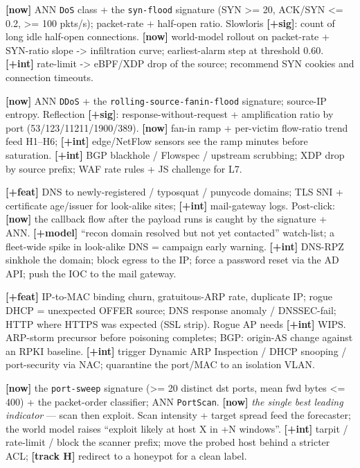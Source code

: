 \documentclass[11pt,a4paper]{article}
\begin{document}
{\textbf{[now]} ANN \texttt{DoS} class + the \texttt{syn-flood} signature (SYN >= 20, ACK/SYN <= 0.2, >= 100 pkts/s); packet-rate + half-open ratio. Slowloris \textbf{[+sig]}: count of long idle half-open connections.}
{\textbf{[now]} world-model rollout on packet-rate + SYN-ratio slope -> infiltration curve; earliest-alarm step at threshold 0.60.}
{\textbf{[+int]} rate-limit -> eBPF/XDP drop of the source; recommend SYN cookies and connection timeouts.}

{\textbf{[now]} ANN \texttt{DDoS} + the \texttt{rolling-source-fanin-flood} signature; source-IP entropy. Reflection \textbf{[+sig]}: response-without-request + amplification ratio by port (53/123/11211/1900/389).}
{\textbf{[now]} fan-in ramp + per-victim flow-ratio trend feed H1--H6; \textbf{[+int]} edge/NetFlow sensors see the ramp minutes before saturation.}
{\textbf{[+int]} BGP blackhole / Flowspec / upstream scrubbing; XDP drop by source prefix; WAF rate rules + JS challenge for L7.}

{\textbf{[+feat]} DNS to newly-registered / typosquat / punycode domains; TLS SNI + certificate age/issuer for look-alike sites; \textbf{[+int]} mail-gateway logs. Post-click: \textbf{[now]} the callback flow after the payload runs is caught by the signature + ANN.}
{\textbf{[+model]} ``recon domain resolved but not yet contacted'' watch-list; a fleet-wide spike in look-alike DNS = campaign early warning.}
{\textbf{[+int]} DNS-RPZ sinkhole the domain; block egress to the IP; force a password reset via the AD API; push the IOC to the mail gateway.}

{\textbf{[+feat]} IP-to-MAC binding churn, gratuitous-ARP rate, duplicate IP; rogue DHCP = unexpected OFFER source; DNS response anomaly / DNSSEC-fail; HTTP where HTTPS was expected (SSL strip). Rogue AP needs \textbf{[+int]} WIPS.}
{ARP-storm precursor before poisoning completes; BGP: origin-AS change against an RPKI baseline.}
{\textbf{[+int]} trigger Dynamic ARP Inspection / DHCP snooping / port-security via NAC; quarantine the port/MAC to an isolation VLAN.}

{\textbf{[now]} the \texttt{port-sweep} signature (>= 20 distinct dst ports, mean fwd bytes <= 400) + the packet-order classifier; ANN \texttt{PortScan}.}
{\textbf{[now]} \emph{the single best leading indicator} --- scan then exploit. Scan intensity + target spread feed the forecaster; the world model raises ``exploit likely at host X in +N windows''.}
{\textbf{[+int]} tarpit / rate-limit / block the scanner prefix; move the probed host behind a stricter ACL; \textbf{[track H]} redirect to a honeypot for a clean label.}
\end{document}
